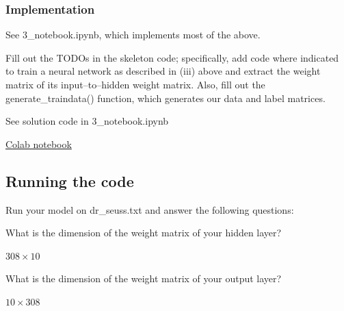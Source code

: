 \subsubsection{Implementation}

See 3_notebook.ipynb, which implements most of the above.

\problem[10]
Fill out the TODOs in the skeleton code; specifically, add code where indicated to train a neural network as described in (iii) above and extract the weight matrix of its input--to--hidden weight matrix. Also, fill out the generate\_traindata() function, which generates our data and label matrices.


\begin{solution}
See solution code in 3_notebook.ipynb %

\href{https://colab.research.google.com/drive/1llxzBRPRJORS8Iplyp4qiohv-CA_jwrb?usp=sharing}{Colab notebook}
\end{solution}

\subsection{Running the code}
Run your model on dr_seuss.txt and answer the following questions:

\problem[2]
What is the dimension of the weight matrix of your hidden layer?

\begin{solution}
	$308 \times 10$
\end{solution}

\problem[2]
What is the dimension of the weight matrix of your output layer?
\begin{solution}
	$10 \times 308$
\end{solution}

